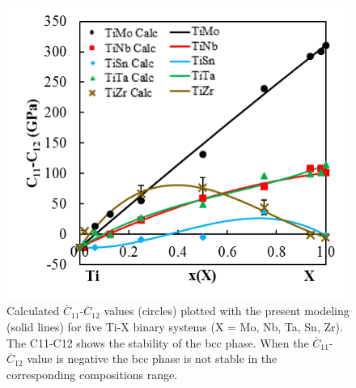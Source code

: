 \pagebreak
\begin{figure}[H]
	\centering
	\includegraphics[width=\textwidth]{Chapter-5/Figures/tixc11-c12.png}
	\caption{Calculated $\overline{C}_{11}$-$\overline{C}_{12}$ values (circles) plotted with the present modeling (solid lines) for five Ti-X binary systems (X = Mo, Nb, Ta, Sn, Zr). The C11-C12 shows the stability of the bcc phase. When the $\overline{C}_{11}$-$\overline{C}_{12}$ value is negative the bcc phase is not stable in the corresponding compositions range.}
	\label{Ch5-figure:tixc11-c12}
\end{figure}

